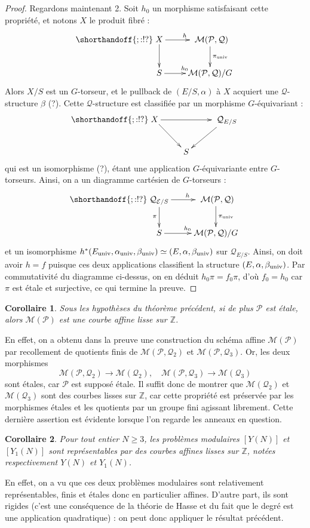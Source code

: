 \documentclass[11pt,a4paper]{article}
\newcommand{\Z}{\mathbb{Z}}
\newcommand{\E}{\mathcal{E}}
\renewcommand{\Pr}{\mathcal{P}}
\newcommand{\Qr}{\mathcal{Q}}
\newcommand{\M}{\mathcal{M}}
\newcommand{\vers}{\longrightarrow}
\newtheorem*{cor}{Corollaire}
\theoremstyle{definition}
\begin{document}
\begin{proof}
Regardons maintenant 2. Soit $h_0$ un morphisme satisfaisant cette propriété, et notons $X$ le produit fibré :
$$
\shorthandoff{;:!?}
\xymatrix {
X \ar[d] \ar[r]^h &\ \M(\Pr,\Qr) \ar[d]^{\pi_\univ} \\
 S \ar[r]^{h_0} & \M(\Pr,\Qr)/G
}
$$
Alors $X/S$ est un $G$-torseur, et le pullback de $(E/S, \alpha)$ à $X$ acquiert une $\Qr$-structure $\beta$ (?). Cette $\Qr$-structure est classifiée par un morphisme $G$-équivariant :
$$
\shorthandoff{;:!?}
\xymatrix {
X \ar[dr] \ar[rr] & &\ \Qr_{E/S} \ar[dl] \\
& S &
}
$$
qui est un isomorphisme (?), étant une application $G$-équivariante entre $G$-torseurs. Ainsi, on a un diagramme cartésien de $G$-torseurs :
$$
\shorthandoff{;:!?}
\xymatrix {
\Qr_{\E/S} \ar[d]_\pi \ar[r]^h &\ \M(\Pr,\Qr) \ar[d]^{\pi_\univ} \\
 S \ar[r]^{h_0} & \M(\Pr,\Qr)/G
}
$$
et un isomorphisme $h^*(E_{\mathrm{univ}}, \alpha_{\mathrm{univ}}, \beta_{\mathrm{univ}}) \simeq (E,\alpha, \beta_{\mathrm{univ}})$ sur $\Qr_{E/S}$. Ainsi, on doit avoir $h = f$ puisque ces deux applications classifient la structure $(E, \alpha, \beta_{\mathrm{univ}})$. Par commutativité du diagramme ci-dessus, on en déduit $h_0\pi = f_0 \pi$, d'où $f_0 = h_0$ car $\pi$ est étale et surjective, ce qui termine la preuve.
\end{proof}

\begin{cor}
Sous les hypothèses du théorème précédent, si de plus $\Pr$ est étale, alors $\M(\Pr)$ est une courbe affine lisse sur $\Z$.
\end{cor}
En effet, on a obtenu dans la preuve une construction du schéma affine $\M(\Pr)$ par recollement de quotients finis de $\M(\Pr, \Qr_2)$ et $\M(\Pr, \Qr_3)$. Or, les deux morphismes
$$\M(\Pr, \Qr_2)\vers \M(\Qr_2),\quad \M(\Pr, \Qr_3)\vers \M(\Qr_3)$$
sont étales, car $\Pr$ est supposé étale. Il suffit donc de montrer que $\M(\Qr_2)$ et $\M(\Qr_3)$ sont des courbes lisses sur $\Z$, car cette propriété est préservée par les morphismes étales et les quotients par un groupe fini agissant librement. Cette dernière assertion est évidente lorsque l'on regarde les anneaux en question.

\begin{cor}
Pour tout entier $N\geq 3$, les problèmes modulaires $[Y(N)]$ et $[Y_1(N)]$ sont représentables par des courbes affines lisses sur $\Z$, notées respectivement $Y(N)$ et $Y_1(N)$.
\end{cor}

En effet, on a vu que ces deux problèmes modulaires sont relativement représentables, finis et étales donc en particulier affines. D'autre part, ils sont rigides (c'est une conséquence de la théorie de Hasse et du fait que le degré est une application quadratique) : on peut donc appliquer le résultat précédent.
\end{document}
